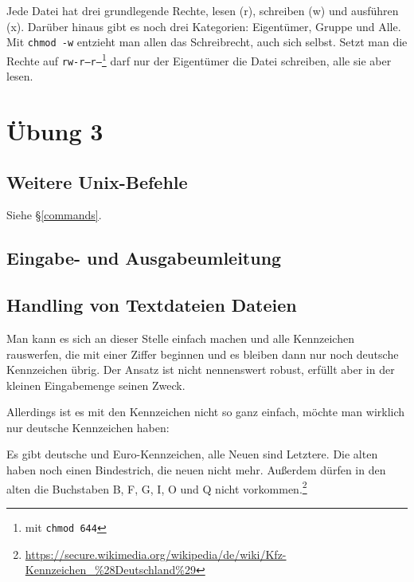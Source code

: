 \documentclass[12pt]{article}
\begin{document}
Jede Datei hat drei grundlegende Rechte, lesen (r), schreiben (w) und ausführen (x). Darüber hinaus gibt es noch drei Kategorien: Eigentümer, Gruppe und Alle. Mit \texttt{chmod -w} entzieht man allen das Schreibrecht, auch sich selbst. Setzt man die Rechte auf \texttt{rw-r--r--}\footnote{mit \texttt{chmod 644}} darf nur der Eigentümer die Datei schreiben, alle sie aber lesen.

\section{Übung 3}

\subsection{Weitere Unix-Befehle}

Siehe §\ref{commands}.

\subsection{Eingabe- und Ausgabeumleitung}



\subsection{Handling von Textdateien Dateien}

Man kann es sich an dieser Stelle einfach machen und alle Kennzeichen rauswerfen, die mit einer Ziffer beginnen und es bleiben dann nur noch deutsche Kennzeichen übrig. Der Ansatz ist nicht nennenswert robust, erfüllt aber in der kleinen Eingabemenge seinen Zweck.





Allerdings ist es mit den Kennzeichen nicht so ganz einfach, möchte man wirklich nur deutsche Kennzeichen haben:

Es gibt deutsche und Euro-Kennzeichen, alle Neuen sind Letztere. Die alten haben noch einen Bindestrich, die neuen nicht mehr. Außerdem dürfen in den alten die Buchstaben B, F, G, I, O und Q nicht vorkommen.\footnote{\url{https://secure.wikimedia.org/wikipedia/de/wiki/Kfz-Kennzeichen_\%28Deutschland\%29}}
\end{document}
